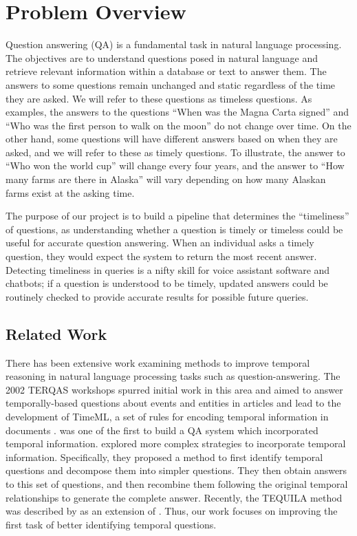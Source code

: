 \documentclass{article}
\begin{document}
\section{Problem Overview}
\label{overview}
Question answering (QA) is a fundamental task in natural language processing. The objectives are to understand questions posed in natural language and retrieve relevant information within a database or text to answer them. The answers to some questions remain unchanged and static regardless of the time they are asked. We will refer to these questions as timeless questions. As examples, the answers to the questions “When was the Magna Carta signed” and “Who was the first person to walk on the moon” do not change over time. On the other hand, some questions will have different answers based on when they are asked, and we will refer to these as timely questions. To illustrate, the answer to “Who won the world cup” will change every four years, and the answer to “How many farms are there in Alaska” will vary depending on how many Alaskan farms exist at the asking time.

The purpose of our project is to build a pipeline that determines the “timeliness” of questions, as understanding whether a question is timely or timeless could be useful for accurate question answering. When an individual asks a timely question, they would expect the system to return the most recent answer. Detecting timeliness in queries is a nifty skill for voice assistant software and chatbots; if a question is understood to be timely, updated answers could be routinely checked to provide accurate results for possible future queries.


\subsection{Related Work}

There has been extensive work examining methods to improve temporal reasoning in natural language processing tasks such as question-answering. The 2002 TERQAS workshops spurred initial work in this area and aimed to answer temporally-based questions about events and entities in articles and lead to the development of TimeML, a set of rules for encoding temporal information in documents \cite{radev2002using}. \cite{breck2000another} was one of the first to build a QA system which incorporated temporal information. \cite{saquete2009enhancing} explored more complex strategies to incorporate temporal information. Specifically, they proposed a method to first identify temporal questions and decompose them into simpler questions. They then obtain answers to this set of questions, and then recombine them following the original temporal relationships to generate the complete answer. Recently, the TEQUILA method was described by \cite{jia2018tequila} as an extension of \cite{saquete2009enhancing}.  Thus, our work focuses on improving the first task of better identifying temporal questions. 
\end{document}
